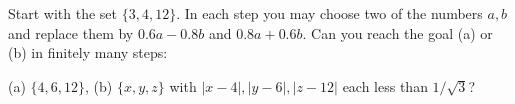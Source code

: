 Start with the set $\{3, 4, 12\}$. In each step you may choose two of the numbers $a, b$ and replace them by $0.6a - 0.8b$ and $0.8a + 0.6b$. Can you reach the goal (a) or (b) in finitely many steps:

(a) $\{4, 6, 12\}$, (b) $\{x, y, z\}$ with $|x - 4|, |y - 6|, |z - 12|$ each less than $1/\sqrt{3}$?
